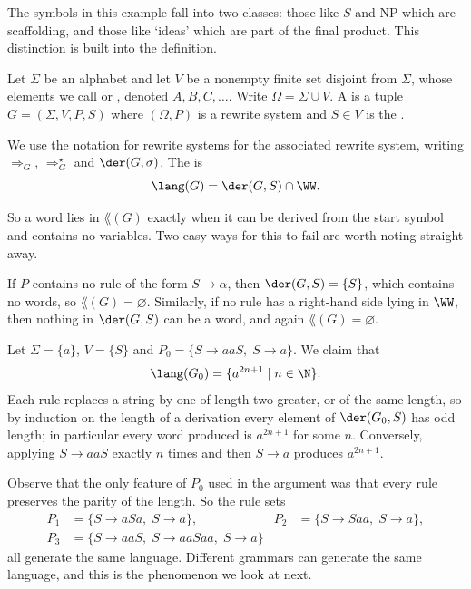The symbols in this example fall into two classes: those like $S$ and NP which are scaffolding, and those like `ideas' which are part of the final product. This distinction is built into the definition.

\begin{definition}[Grammar]
	Let $\Sigma$ be an alphabet and let $V$ be a nonempty finite set disjoint from $\Sigma$, whose elements we call  or , denoted $A, B, C, \dots$. Write $\Omega = \Sigma \cup V$. A  is a tuple $G = (\Sigma, V, P, S)$ where $(\Omega, P)$ is a rewrite system and $S \in V$ is the .

	We use the notation for rewrite systems for the associated rewrite system, writing $\Rightarrow_G$, $\Rightarrow_G^\star$ and $\der(G, \sigma)$. The  is
	$$\lang(G) = \der(G, S) \cap \WW.$$
\end{definition}

So a word lies in $\lang(G)$ exactly when it can be derived from the start symbol and contains no variables. Two easy ways for this to fail are worth noting straight away.

\begin{example}
	If $P$ contains no rule of the form $S \to \alpha$, then $\der(G,S) = \{S\}$, which contains no words, so $\lang(G) = \varnothing$. Similarly, if no rule has a right-hand side lying in $\WW$, then nothing in $\der(G,S)$ can be a word, and again $\lang(G) = \varnothing$.
\end{example}

\begin{example}\label{ex:oddas}
	Let $\Sigma = \{a\}$, $V = \{S\}$ and $P_0 = \{S \to aaS,\; S \to a\}$. We claim that
	$$\lang(G_0) = \{a^{2n+1} \mid n \in \N\}.$$
	Each rule replaces a string by one of length two greater, or of the same length, so by induction on the length of a derivation every element of $\der(G_0, S)$ has odd length; in particular every word produced is $a^{2n+1}$ for some $n$. Conversely, applying $S \to aaS$ exactly $n$ times and then $S \to a$ produces $a^{2n+1}$.

	Observe that the only feature of $P_0$ used in the argument was that every rule preserves the parity of the length. So the rule sets
	\begin{align*}
		P_1 &= \{S \to aSa,\; S \to a\}, & P_2 &= \{S \to Saa,\; S \to a\}, \\
		P_3 &= \{S \to aaS,\; S \to aaSaa,\; S \to a\}
	\end{align*}
	all generate the same language. Different grammars can generate the same language, and this is the phenomenon we look at next.
\end{example}

